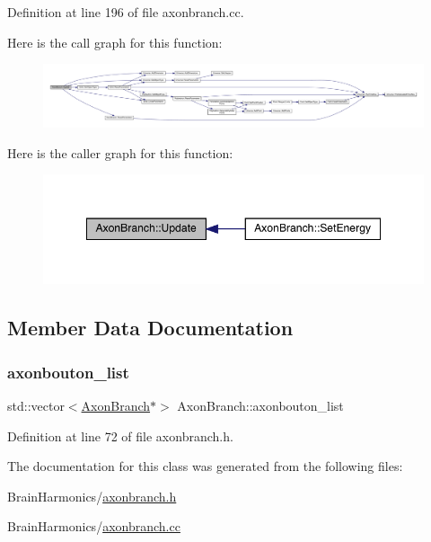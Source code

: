Definition at line 196 of file axonbranch.\+cc.

Here is the call graph for this function\+:
\nopagebreak
\begin{figure}[H]
\begin{center}
\leavevmode
\includegraphics[width=350pt]{class_axon_branch_a5a80bcccdc2be9f77fca25131937b52f_cgraph}
\end{center}
\end{figure}
Here is the caller graph for this function\+:
\nopagebreak
\begin{figure}[H]
\begin{center}
\leavevmode
\includegraphics[width=348pt]{class_axon_branch_a5a80bcccdc2be9f77fca25131937b52f_icgraph}
\end{center}
\end{figure}


\subsection{Member Data Documentation}
\mbox{\label{class_axon_branch_a43224f9fcb62274709438c9833cb10e5}} 
\subsubsection{\texorpdfstring{axonbouton\+\_\+list}{axonbouton\_list}}
{\footnotesize\ttfamily std\+::vector$<$\hyperlink{class_axon_branch}{Axon\+Branch}$\ast$$>$ Axon\+Branch\+::axonbouton\+\_\+list\hspace{0.3cm}{\ttfamily [protected]}}



Definition at line 72 of file axonbranch.\+h.



The documentation for this class was generated from the following files\+:\begin{DoxyCompactItemize}
\item 
Brain\+Harmonics/\hyperlink{axonbranch_8h}{axonbranch.\+h}\item 
Brain\+Harmonics/\hyperlink{axonbranch_8cc}{axonbranch.\+cc}\end{DoxyCompactItemize}
